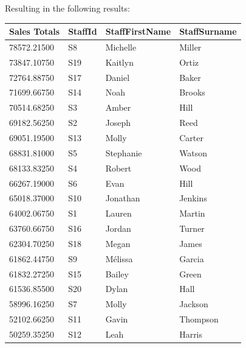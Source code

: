\documentclass{article}
\begin{document}
            Resulting in the following results:

            \begin{table}[H]
                \centering
                \begin{tabular}{|l|l|l|l|}
                \hline
                Sales Totals & StaffId & StaffFirstName & StaffSurname \\ \hline
                78572.21500  & S8      & Michelle       & Miller       \\ \hline
                73847.10750  & S19     & Kaitlyn        & Ortiz        \\ \hline
                72764.88750  & S17     & Daniel         & Baker        \\ \hline
                71699.66750  & S14     & Noah           & Brooks       \\ \hline
                70514.68250  & S3      & Amber          & Hill         \\ \hline
                69182.56250  & S2      & Joseph         & Reed         \\ \hline
                69051.19500  & S13     & Molly          & Carter       \\ \hline
                68831.81000  & S5      & Stephanie      & Watson       \\ \hline
                68133.83250  & S4      & Robert         & Wood         \\ \hline
                66267.19000  & S6      & Evan           & Hill         \\ \hline
                65018.37000  & S10     & Jonathan       & Jenkins      \\ \hline
                64002.06750  & S1      & Lauren         & Martin       \\ \hline
                63760.66750  & S16     & Jordan         & Turner       \\ \hline
                62304.70250  & S18     & Megan          & James        \\ \hline
                61862.44750  & S9      & Mélissa        & Garcia       \\ \hline
                61832.27250  & S15     & Bailey         & Green        \\ \hline
                61536.85500  & S20     & Dylan          & Hall         \\ \hline
                58996.16250  & S7      & Molly          & Jackson      \\ \hline
                52102.66250  & S11     & Gavin          & Thompson     \\ \hline
                50259.35250  & S12     & Leah           & Harris       \\ \hline
                \end{tabular}
            \end{table}
\end{document}
